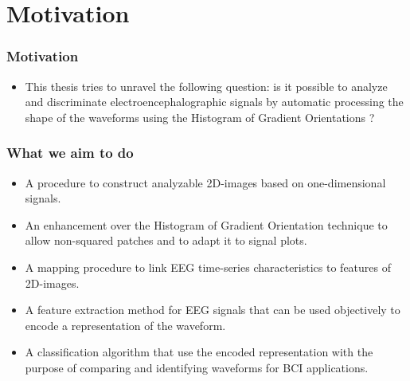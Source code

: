 \documentclass[aspectratio=169]{beamer}
\begin{document}
    \section{Motivation}
    \begin{frame}
        \frametitle{Motivation}
        \begin{center}
            \begin{itemize}
                \item This thesis tries to unravel the following question: is it possible to analyze and discriminate electroencephalographic signals by automatic processing the shape of the waveforms using the Histogram of Gradient Orientations ?
            \end{itemize}
        \end{center}
    \end{frame}
    \begin{frame}
        \frametitle{What we aim to do}
        \begin{center}
            \begin{itemize}
\begin{itemize}
\item A procedure to construct analyzable 2D-images based on one-dimensional signals.
\item An enhancement over the Histogram of Gradient Orientation technique to allow non-squared patches and to adapt it to signal plots.
\item A mapping procedure to link EEG time-series characteristics to features of 2D-images.
\item A feature extraction method for EEG signals that can be used objectively to encode a representation of the waveform.
\item A classification algorithm that use the encoded representation with the purpose of comparing and identifying waveforms for BCI applications.
\end{itemize}
            \end{itemize}
        \end{center}
    \end{frame}
    
\end{document}
